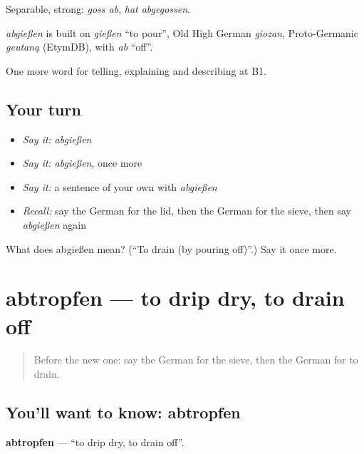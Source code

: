 Separable, strong: \emph{goss ab}, \emph{hat abgegossen}.

\begin{cousinweb}
\emph{abgießen} is built on \emph{gießen} \textquotedblleft{}to pour\textquotedblright{}, Old High German \emph{giozan}, Proto-Germanic \emph{geutaną} (EtymDB), with \emph{ab} \textquotedblleft{}off\textquotedblright{}.
\end{cousinweb}

\begin{grammarlens}[title={What you've built}]
One more word for telling, explaining and describing at B1.
\end{grammarlens}

\subsection*{Your turn}
\begin{itemize}
\raggedright
  \item \emph{Say it:} \emph{abgießen}
  \item \emph{Say it:} \emph{abgießen}, once more
  \item \emph{Say it:} a sentence of your own with \emph{abgießen}
  \item \emph{Recall:} say the German for the lid, then the German for the sieve, then say \emph{abgießen} again
\end{itemize}

\begin{tcolorbox}[breakable,colback=teal!4,colframe=teal!35!black,title={Before you move on}]
What does abgießen mean? (\textquotedblleft{}To drain (by pouring off)\textquotedblright{}.) Say it once more.
\end{tcolorbox}
\section[abtropfen]{abtropfen — to drip dry, to drain off}

\label{lesson:GE-C328-abtropfen}



\begin{quote}
Before the new one: say the German for the sieve, then the German for to drain.
\end{quote}

\subsection*{You'll want to know: abtropfen}
\textbf{abtropfen} — \textquotedblleft{}to drip dry, to drain off\textquotedblright{}.


